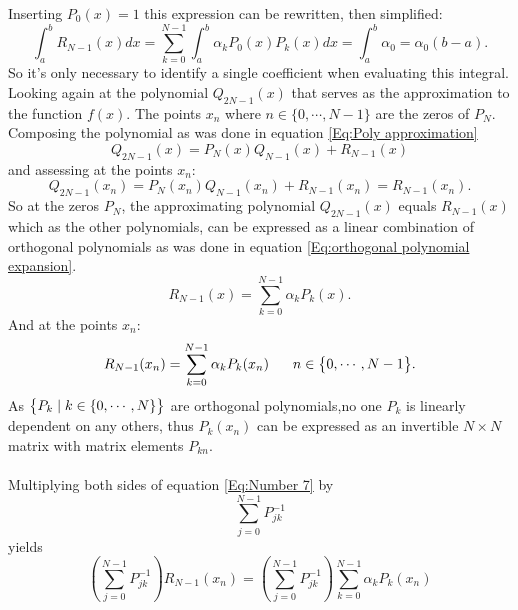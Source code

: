 \documentclass[10pt,a4paper]{article}
\begin{document}
Inserting $P_0(x) = 1$ this expression can be rewritten, then simplified:
\begin{equation}\label{Eq: integral as a function of a0}
\int_{a}^bR_{N-1}(x)dx = \sum\limits_{k=0}^{N-1}  \int_{a}^b \alpha_kP_0(x) P_k(x)dx = \int_{a}^b \alpha_0 = \alpha_0(b-a).
\end{equation}
So it's only necessary to identify a single coefficient when evaluating this integral.\\Looking again at the polynomial $Q_{2N-1}(x)$ that serves as the approximation to the function $f(x)$. The points $x_n$ where $n \in \big\{0,\cdots,N-1\big\}$ are the zeros of $P_N$. Composing the polynomial as was done in equation \ref{Eq:Poly approximation}
\begin{equation*}
Q_{2N-1}(x) = P_N(x)Q_{N-1}(x)+R_{N-1}(x)
\end{equation*}
and assessing at the points $x_n$:
\begin{equation}\label{Eq:Q2n_1 and Rn_1}
Q_{2N-1}(x_n) = P_N(x_n)Q_{N-1}(x_n)+R_{N-1}(x_n) = R_{N-1}(x_n).
\end{equation}
So at the zeros $P_N$, the approximating polynomial $Q_{2N-1}(x)$ equals $R_{N-1}(x)$ which as the other polynomials, can be expressed as a linear combination of orthogonal polynomials as was done in equation \ref{Eq:orthogonal polynomial expansion}.
\begin{equation*}
R_{N-1}(x) = \sum\limits_{k=0}^{N-1} \alpha_k P_k(x).
\end{equation*} 
And at the points $x_n$:
\begin{equation}\label{Eq:Number 7}
R_{N-1}(x_n) = \sum\limits_{k=0}^{N-1} \alpha_k P_k(x_n)\hspace{6mm}n \in \big\{0,\cdots,N-1\big\}.
\end{equation}
As $\big\{ P_k\hspace{1mm}|\hspace{1mm} k \in \{0,\cdots,N\} \big\}$ are orthogonal polynomials,no one $P_k$ is linearly dependent on any others, thus $P_k(x_n)$ can be expressed as an invertible $N\times N$ matrix with matrix elements $P_{kn}$.\\\\Multiplying both sides of equation \ref{Eq:Number 7} by 
\begin{equation}
\sum\limits_{j=0}^{N-1}P_{jk}^{-1}
\end{equation}
yields
\begin{equation*}
\left( \sum\limits_{j=0}^{N-1}P_{jk}^{-1} \right)R_{N-1}(x_n) = \left( \sum\limits_{j=0}^{N-1}P_{jk}^{-1} \right)\sum\limits_{k=0}^{N-1} \alpha_k P_k(x_n)
\end{equation*}
\end{document}
